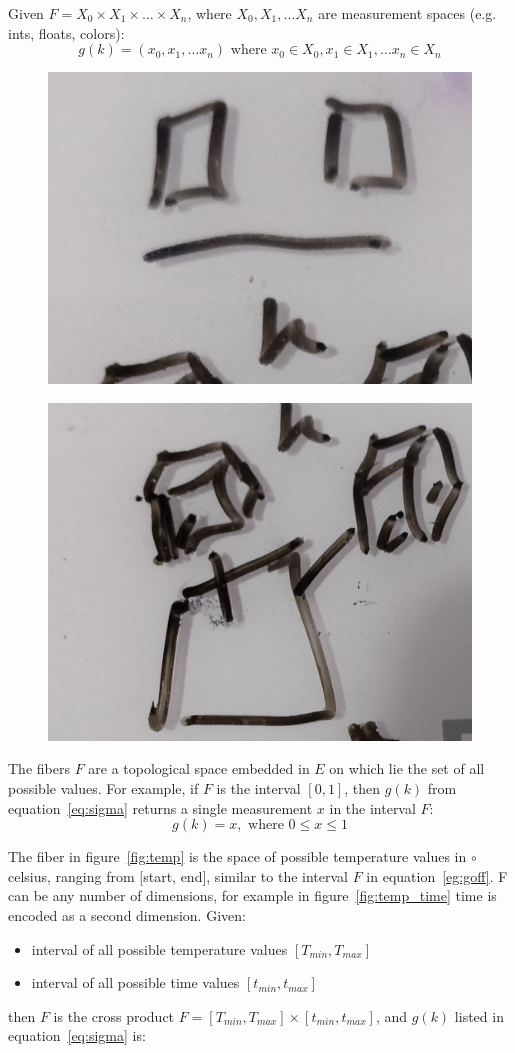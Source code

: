 \documentclass[../main.tex]{subfiles}
\begin{document}
Given $F = X_{0} \times X_{1} \times \ldots \times X_{n}$, where $X_{0}, X_{1}, \ldots X_{n}$ are measurement spaces (e.g. ints, floats, colors): 
\begin{equation}
g(k) = (x_0, x_1, \ldots x_n) \text{ where } x_0 \in X_0, x_1 \in X_1, \ldots x_n \in X_n
\end{equation}



\begin{figure}[ht]
    \includegraphics[width=0.2\linewidth]{figures/sections/math/temp_2f.png}
    \label{fig:}
\end{figure}
\begin{figure}[ht]
    \includegraphics[width=0.2\linewidth]{figures/sections/math/temp_3f.png}
\end{figure}
The fibers $F$ are a topological space embedded in $E$ on which lie the set of all possible values. For example, if $F$ is the interval $[0, 1]$, then $g(k)$ from equation~\ref{eq:sigma} returns a single measurement $x$ in the interval $F$:
\begin{equation}
    \label{eg:goff}
    g(k) = x, \text{ where } 0\leq x \leq 1
\end{equation}

The fiber in figure~\ref{fig:temp} is the space of possible temperature values in $\circ$ celsius, ranging from [start, end], similar to the interval $F$ in equation~\ref{eg:goff}. F can be any number of dimensions, for example in figure~\ref{fig:temp_time} time is encoded as a second dimension. Given:
\begin{itemize}
\item interval of all possible temperature values $[T_{min}, T_{max}]$ 
\item interval of all possible time values $[t_{min}, t_{max}]$
\end{itemize}

then $F$ is the cross product $F= [T_{min}, T_{max}] \times [t_{min}, t_{max}]$, and $g(k)$ listed in equation~\ref{eq:sigma} is:
\end{document}
